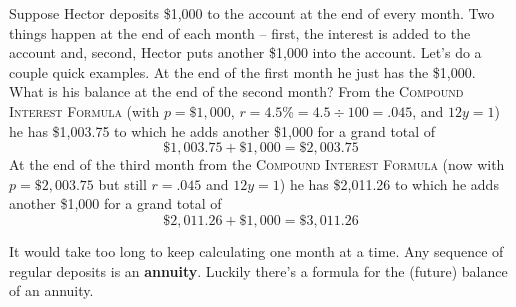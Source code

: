 Suppose Hector deposits \$1,000 to the account at the end of every month.  Two things happen at the end of each month -- first, the interest is added to the account and, second, Hector puts another \$1,000 into the account. Let's do a couple quick examples.  At the end of the first month he just has the \$1,000.  What is his balance at the end of the second month? From the \textsc{Compound Interest Formula} (with $p=\$1,000$, $r=4.5\% = 4.5 \div 100 = .045$, and $12y=1$) he has \$1,003.75 to which he adds another \$1,000 for a grand total of 
$$ \$1,003.75+  \$1,000= \$2,003.75$$
At the end of the third month from the \textsc{Compound Interest Formula} (now with $p=\$2,003.75$ but still $r=.045$ and $12y=1$) he has \$2,011.26 to which he adds another \$1,000 for a grand total of 
$$\$2,011.26 + \$1,000 = \$3,011.26$$


It would take too long to keep calculating one month at a time.  Any sequence of regular deposits is an \textbf{annuity}.  Luckily there's a formula for the (future) balance of an annuity. 

 \bigskip
\bigskip

